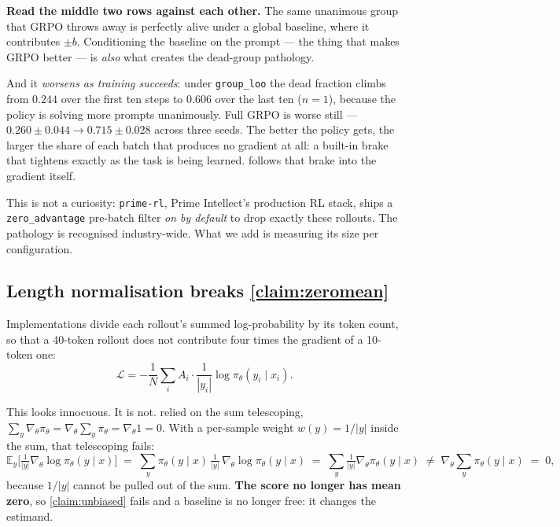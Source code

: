 \documentclass[11pt,letterpaper]{article}
\theoremstyle{definition}
\newcommand{\E}{\mathbb{E}}
\newcommand{\pol}{\pi_\theta}
\newcommand{\grad}{\nabla_\theta}
\newcommand{\score}{\grad \log \pol(y \mid x)}
\newcommand{\Adv}{A}
\begin{document}
\textbf{Read the middle two rows against each other.} The same unanimous group that GRPO throws away
is perfectly alive under a global baseline, where it contributes $\pm b$. Conditioning the baseline on
the prompt --- the thing that makes GRPO better --- is \emph{also} what creates the dead-group
pathology.

And it \emph{worsens as training succeeds}: under \texttt{group\_loo} the dead fraction climbs from
$0.244$ over the first ten steps to $0.606$ over the last ten ($n=1$), because the policy is solving
more prompts unanimously. Full GRPO is worse still --- $0.260 \pm 0.044 \to 0.715 \pm 0.028$ across
three seeds. The better the policy gets, the larger the share of each batch that produces no gradient
at all: a built-in brake that tightens exactly as the task is being learned. 
follows that brake into the gradient itself.

This is not a curiosity: \texttt{prime-rl}, Prime Intellect's production RL stack, ships a
\texttt{zero\_advantage} pre-batch filter \emph{on by default} to drop exactly these rollouts. The
pathology is recognised industry-wide. What we add is measuring its size per configuration.

\subsection[Length normalisation breaks the zero-mean score]
           {Length normalisation breaks \cref{claim:zeromean}}
\label{sec:lennorm}

Implementations divide each rollout's summed log-probability by its token count, so that a 40-token
rollout does not contribute four times the gradient of a 10-token one:
\begin{equation}
  \mathcal{L} = -\frac{1}{N}\sum_i \Adv_i \cdot \frac{1}{|y_i|}\log \pol(y_i \mid x_i).
  \label{eq:lennorm}
\end{equation}

This looks innocuous. It is not.  relied on the sum telescoping,
$\sum_y \grad\pol = \grad\sum_y \pol = \grad 1 = 0$. With a per-sample weight $w(y) = 1/|y|$ inside
the sum, that telescoping fails:
\begin{equation}
  \E_y\Big[\tfrac{1}{|y|}\score\Big] \;=\; \sum_y \pol(y\mid x)\,\tfrac{1}{|y|}\,\grad\log\pol(y\mid x)
  \;=\; \sum_y \tfrac{1}{|y|}\grad \pol(y \mid x) \;\neq\; \grad\!\!\sum_y \pol(y\mid x) \;=\; 0,
\end{equation}
because $1/|y|$ cannot be pulled out of the sum. \textbf{The score no longer has mean zero}, so
\cref{claim:unbiased} fails and a baseline is no longer free: it changes the estimand.
\end{document}
